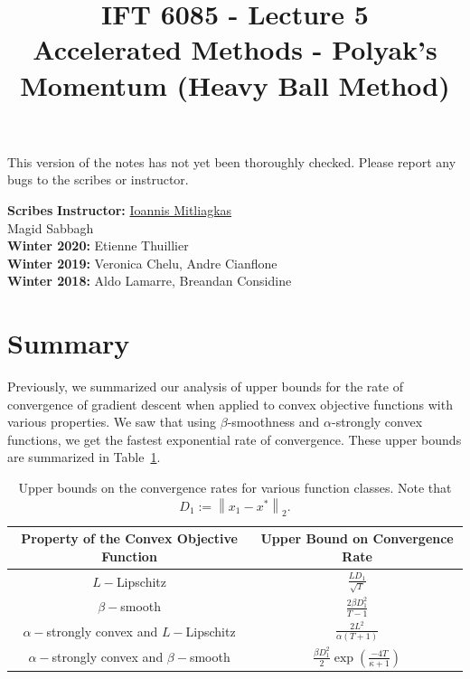 \documentclass{article}
\title{IFT 6085 - Lecture 5 \\ 
Accelerated Methods - Polyak's Momentum (Heavy Ball Method) }
\date{}
\newcommand\norm[1]{\left\lVert#1\right\rVert}
\begin{document}
 

\maketitle

\vspace{-0.5in}
\begin{center}
This version of the notes has not yet been thoroughly checked.
Please report any bugs to the scribes or instructor.
\end{center}
\vspace{0.2in}

\textbf{Scribes}\hfill
\textbf{Instructor:}  {\href{https://mitliagkas.github.io/}{Ioannis Mitliagkas}}\\
 Magid Sabbagh\\
\textbf{Winter 2020:} Etienne Thuillier\\
\textbf{Winter 2019:} Veronica Chelu, Andre Cianflone\\
\textbf{Winter 2018:} Aldo Lamarre, Breandan Considine



\newcommand{\infgc}{\inf_{g \in \mathcal{C}}}
\newcommand{\supgc}{\sup_{g \in \mathcal{C}}}

\newcommand{\Prob}{\mathbb{P}}
\newcommand{\E}{\mathbb{E}}
\newcommand{\reals}{\mathbb{R}}


\section{Summary}

Previously, we summarized our analysis of upper bounds for the rate of convergence of gradient descent when applied to convex objective functions with various properties. 
We saw that using $\beta$-smoothness and $\alpha$-strongly convex functions, we get the fastest exponential rate of convergence.  
These upper bounds are summarized in Table~\ref{tab:upper_bounds}.
\begin{table}[H]
\centering
    {
    \renewcommand{\arraystretch}{2.0}
    \begin{tabular}{cc}
    \toprule
		\textbf{Property of the Convex Objective Function} 
		& 
		\textbf{Upper Bound on Convergence Rate}
		\\
	\toprule
		$L-$Lipschitz & $ \frac{L D_1}{\sqrt{T}}$
	\\
		$\beta-$smooth & $ \frac{2 \beta D^2_1 }{T - 1}$
	\\
		$\alpha-$strongly convex and $L-$Lipschitz & $ \frac{2 L^2}{\alpha \left(T+1\right)}$
	\\
		$\alpha-$strongly convex and $\beta-$smooth & $ \frac{\beta D^2_1}{2} \exp({\frac{-4T}{\kappa + 1}})$
		\\
	\bottomrule
	\end{tabular}
	}
\caption{
    Upper bounds on the convergence rates for various function classes. Note that $D_1 := \norm{x_1 - x^*}_2$.
}
\label{tab:upper_bounds}
\end{table}
\end{document}
